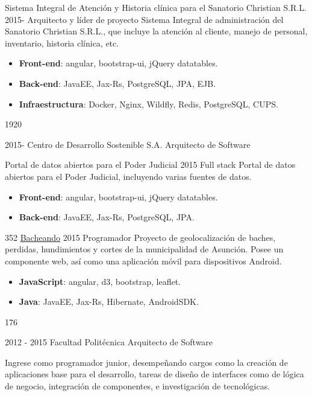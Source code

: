 \documentclass[]{friggeri-cv}
\begin{document}
\begin{entrylist}
{    \proyecto
        {Sistema Integral de Atención y Historia clínica para el Sanatorio Christian S.R.L.}
        {2015-}
        {Arquitecto y líder de proyecto}
        {Sistema Integral de administración del Sanatorio Christian S.R.L., que incluye la atención 
        	al cliente, manejo de personal, inventario, historia clínica, etc.}
        {\begin{itemize}
            \item \textbf{Front-end}: angular, bootstrap-ui, jQuery datatables.
            \item \textbf{Back-end}: JavaEE, Jax-Rs, PostgreSQL, JPA, EJB.
            \item \textbf{Infraestructura}: Docker, Nginx, Wildfly, Redis, PostgreSQL, CUPS.
        \end{itemize}}
        {1920}
      }
      {}
    
  \entry
    {2015-}
    {Centro de Desarrollo Sostenible S.A.}
    {Arquitecto de Software}
    {
        
    \proyecto
        {Portal de datos abiertos para el Poder Judicial}
        {2015}
        {Full stack}
        {Portal de datos abiertos para el Poder Judicial, incluyendo varias
        	fuentes de datos.}
        {\begin{itemize}
            \item \textbf{Front-end}: angular, bootstrap-ui, jQuery datatables.
            \item \textbf{Back-end}: JavaEE, Jax-Rs, PostgreSQL, JPA.
        \end{itemize}}
        {352} 
    \proyecto
        {\href{http://bacheando.com/}{Bacheando}}
        {2015}
        {Programador}
        {Proyecto de geolocalización de baches, perdidas, hundimientos y
            cortes de la municipalidad de Asunción.
            Posee un componente web, así como una aplicación móvil para
            dispositivos Android.}
        {\begin{itemize}
            \item \textbf{JavaScript}: angular, d3, bootstrap, leaflet.
            \item \textbf{Java}: JavaEE, Jax-Rs, Hibernate, AndroidSDK.
        \end{itemize}}
        {176} 
        
	}
    {}


\entry
    {2012 - 2015}
    {Facultad Politécnica}
    {Arquitecto de Software}
    {Ingrese como programador junior, desempeñando cargos como la creación de
        aplicaciones base para el desarrollo, tareas de diseño de interfaces
        como de lógica de negocio, integración de componentes, e investigación
        de tecnológicas.

}
\end{entrylist}
\end{document}
